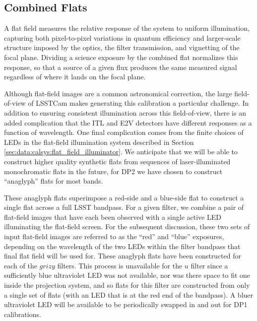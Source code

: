 \subsection{Combined Flats} \label{sec:processing:calibration:flats}

A flat field measures the relative response of the system to uniform illumination, capturing both pixel-to-pixel variations in quantum efficiency and larger-scale structure imposed by the optics, the filter transmission, and vignetting of the focal plane.
Dividing a science exposure by the combined flat normalizes this response, so that a source of a given flux produces the same measured signal regardless of where it lands on the focal plane.

Although flat-field images are a common astronomical correction, the large field-of-view of LSSTCam makes generating this calibration a particular challenge.
In addition to ensuring consistent illumination across this field-of-view, there is an added complication that the ITL and E2V detectors have different responses as a function of wavelength.
One final complication comes from the finite choices of LEDs in the flat-field illumination system described in Section \ref{sec:data:calsys:flat_field_illuminator}.
We anticipate that we will be able to construct higher quality synthetic flats from sequences of laser-illuminated monochromatic flats in the future, for DP2 we have chosen to construct ``anaglyph'' flats for most bands.

These anaglyph flats superimpose a red-side and a blue-side flat to construct a single flat across a full LSST bandpass. For a given filter, we combine a pair of flat-field images that have each been observed with a single active LED illuminating the flat-field screen.
For the subsequent discussion, these two sets of input flat-field images are referred to as the ``red'' and ``blue'' exposures, depending on the wavelength of the two LEDs within the filter bandpass that final flat field will be used for.
These anaglyph flats have been constructed for each of the $grizy$ filters.
This process is unavailable for the $u$ filter since a sufficiently blue ultraviolet LED was not available, nor was there space to fit one inside the projection system, and so flats for this filter are constructed from only a single set of flats (with an LED that is at the red end of the bandpass).
A bluer ultraviolet LED will be available to be periodically swapped in and out for DP1 calibrations.

